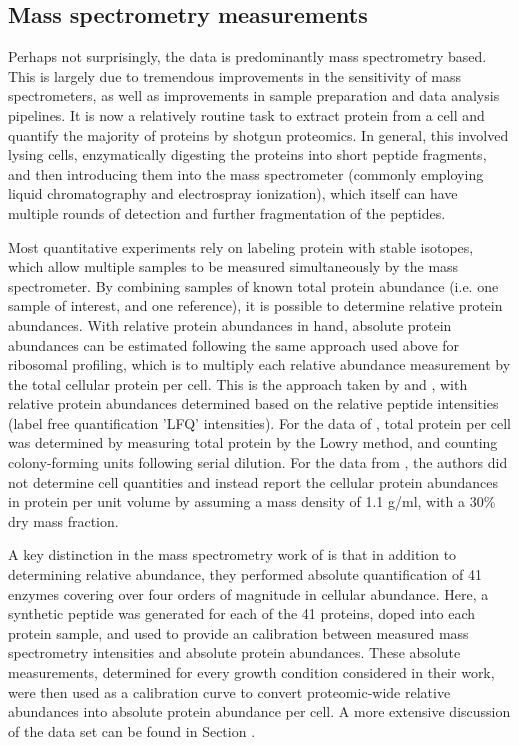 \subsection{Mass spectrometry measurements}

Perhaps not surprisingly, the data is predominantly mass spectrometry based. This is
largely due to tremendous improvements in the sensitivity of mass spectrometers,
as well as improvements in sample preparation and data analysis
pipelines. It is now a relatively routine task to extract protein from a cell
and quantify the majority of proteins by shotgun proteomics. In general, this
involved lysing cells, enzymatically digesting the proteins into short peptide
fragments, and then introducing them into the mass spectrometer (commonly
employing liquid chromatography and electrospray ionization), which itself can
have multiple rounds of detection and further fragmentation of the peptides.

Most quantitative experiments rely on labeling protein with stable isotopes,
which allow multiple samples to be measured simultaneously by the mass
spectrometer. By combining samples of known total protein abundance (i.e. one
sample of interest, and one reference), it is possible to determine relative
protein abundances. With relative protein abundances in hand, absolute protein
abundances can be estimated following the same approach used above for ribosomal
profiling, which is to multiply each relative abundance measurement by the total
cellular protein per cell. This is the approach taken by \cite{valgepea2013} and
\cite{peebo2015}, with relative protein abundances determined based on the
relative peptide intensities (label free quantification 'LFQ' intensities). For
the data of \cite{valgepea2013}, total protein per cell was determined by
measuring  total protein by the Lowry method, and counting colony-forming units
following serial dilution. For the data from   \cite{peebo2015}, the authors did
not determine  cell quantities and instead report the cellular protein
abundances in protein per unit  volume by assuming a mass density of 1.1 g/ml,
with a 30\% dry mass fraction.

A key distinction in the mass spectrometry work of \cite{schmidt2016} is that in
addition to determining relative abundance, they performed absolute
quantification of  41 enzymes covering over four orders of magnitude in cellular
abundance. Here,  a synthetic peptide was generated for each of the 41 proteins,
doped into each protein sample, and used to provide an calibration between
measured mass spectrometry intensities and absolute protein abundances. These
absolute measurements, determined for every growth condition considered in their
work,  were then used as a calibration curve to convert proteomic-wide relative
abundances into  absolute protein abundance per cell. A more extensive
discussion of the \cite{schmidt2016} data set can be found in Section
.

